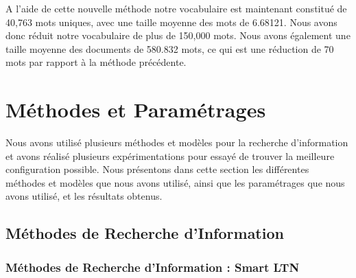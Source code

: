 \documentclass[a4paper, 12pt]{article}
\begin{document}
\begin{table}[!h]
  \begin{minipage}{0.35\linewidth}
      \centering
      \caption{Statistiques de la collection}
  \end{minipage}%
  \hspace{0.05\linewidth} %
  \begin{minipage}{0.60\linewidth}
    A l'aide de cette nouvelle méthode notre vocabulaire est maintenant constitué de 40,763 mots uniques,
    avec une taille moyenne des mots de 6.68121. Nous avons donc réduit notre vocabulaire de plus de 150,000 mots.
    Nous avons également une taille moyenne des documents de 580.832 mots, ce qui est une réduction de 70 mots par rapport à la méthode précédente.
  \end{minipage}
\end{table}

\section{Méthodes et Paramétrages}

Nous avons utilisé plusieurs méthodes et modèles pour la recherche d'information et avons 
réalisé plusieurs expérimentations pour essayé de trouver la meilleure configuration possible. Nous présentons
dans cette section les différentes méthodes et modèles que nous avons utilisé, ainsi que les paramétrages que nous avons utilisé, 
et les résultats obtenus.

\subsection{Méthodes de Recherche d'Information}

\subsubsection{Méthodes de Recherche d'Information : Smart LTN}
\end{document}

